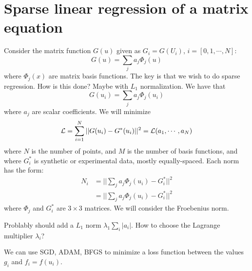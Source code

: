 \documentclass[11pt]{article}
\begin{document}
\section{Sparse linear regression of a matrix equation}
Consider the matrix function $G(u)$ given as $G_i = G(U_i)$, $i=[0,1,\cdots,N]$: 
$$
G(u) = \sum_j a_j \Phi_j(u)
$$
where $\Phi_j(x)$ are matrix basis functions. The key is that we wish to do sparse regression. How is this done? Maybe 
with $L_1$ normalization. 
We have that 
$$ G(u_i) = \sum_j a_j \Phi_j(u_i)$$
where $a_j$ are scalar coefficients. 
We will minimize 
$$
{\cal L} = \sum_{i=1}^N ||G(u_i) - G^*(u_i)||^2 = {\cal L}(a_1,\cdots,a_N)
$$ 
where $N$ is the number of points, and $M$ is the number of basis functions, and  
where $G^*_i$ is synthetic or experimental data, mostly equally-spaced. 
Each norm has the form: 
\begin{align}
  N_i &= ||\sum_j a_j \Phi_j(u_i) - G^*_i||^2 \\
      &= ||\sum_j a_j \Phi_j(u_i) - G^*_i||^2 
\end{align}
where $\Phi_j$ and $G_i^*$ are $3\times 3$ matrices. We will consider the Froebenius norm. 


Problably should add a $L_1$ norm $\lambda_1 \sum_i |a_i|$. How to choose the 
Lagrange multiplier $\lambda_i$? 

We can use SGD, ADAM, BFGS to minimize a loss function between the values $g_i$ and $f_i=f(u_i)$. 
\end{document}
